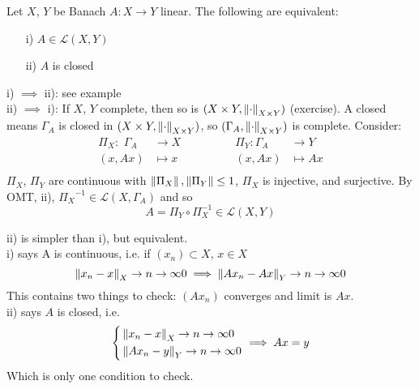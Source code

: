 \begin{theorem}\label{CGT}\nl
Let $X$, $Y$ be Banach $A:X\to Y$ linear. The following are equivalent:
\begin{itemize}
    \item [i)] $A\in\mathcal{L}(X,Y)$
    \item [ii)] $A$ is closed
\end{itemize} 
\begin{pf}{}{}
    i) $\implies$ ii): see example\\
    ii) $\implies$ i): If $X$, $Y$ complete, then so is $(X\times Y,\left\|{\cdot}\right\|_{X\times Y})$ (exercise). A closed means $\Gamma_A$ is closed in $(X\times Y,\left\|{\cdot}\right\|_{X\times Y})$, so $(\Gamma_A,\left\|{\cdot}\right\|_{X\times Y})$ is complete. Consider:
    \begin{equation}
        \begin{aligned}
            \Pi_X:\,\,\Gamma_A&\to X \qquad\qquad& \Pi_Y:\Gamma_A&\to Y\\
        (x,Ax)&\mapsto x  & (x,Ax)&\mapsto Ax\\
        \end{aligned}    
    \end{equation}
$\Pi_X$, $\Pi_Y$ are continuous with $\left\|{\Pi_X}\right\|,\left\|{\Pi_Y}\right\|\leq 1$, $\Pi_X$ is injective, and surjective. By OMT, ii), ${\Pi_X}^{-1}\in\mathcal{L}{(X,\Gamma_A)}$ and so
$$
A=\Pi_Y\circ \Pi_X^{-1}\in\mathcal{L}(X,Y)
$$
\end{pf}
\end{theorem}

\begin{remark}\nl
	ii) is simpler than i), but equivalent.\\
	i) says A is continuous, i.e. if $(x_n)\subset X$, $x\in X$
	$$\left\|{x_n-x}\right\|_X\rightarrow{n\to\infty}0\implies\left\|{Ax_n-Ax}\right\|_Y\rightarrow{n\to\infty}0$$
	This contains two things to check: $(Ax_n)$ converges and limit is $Ax$.\\
	ii) says $A$ is closed, i.e.
	\begin{equation}
		\left\{
		\begin{aligned}
			&\left\|{x_n-x}\right\|_X\rightarrow{n\to\infty}0\\
			&\left\|{Ax_n-y}\right\|_Y\rightarrow{n\to\infty}0\\
		\end{aligned}
		\right.\implies
		Ax=y
	\end{equation}
	Which is only one condition to check.
\end{remark}

